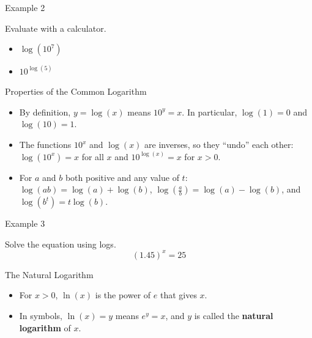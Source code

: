 \documentclass[ignorenonframetext,]{beamer}
\providecommand{\tightlist}{%
  \setlength{\itemsep}{0pt}\setlength{\parskip}{0pt}}
\begin{document}
\begin{frame}{Example 2}

Evaluate with a calculator.

\begin{itemize}
\tightlist
\item
  \(\log(10^7)\)
\item
  \(10^{\log(5)}\)
\end{itemize}

\end{frame}

\begin{frame}{Properties of the Common Logarithm}

\begin{itemize}
\tightlist
\item
  By definition, \(y = \log(x)\) means \(10^y = x\). In particular,
  \(\log(1) = 0\) and \(\log(10) = 1\).
\item
  The functions \(10^x\) and \(\log(x)\) are inverses, so they ``undo''
  each other: \(\log(10^x) = x\) for all \(x\) and \(10^{\log(x)} = x\)
  for \(x > 0\).
\item
  For \(a\) and \(b\) both positive and any value of \(t\):
  \(\log(ab) = \log(a) + \log(b)\),
  \(\log\left(\frac{a}{b}\right) = \log(a) - \log(b)\), and
  \(\log(b^t) = t\log(b)\).
\end{itemize}

\end{frame}

\begin{frame}{Example 3}

Solve the equation using logs. \[(1.45)^x = 25\]

\end{frame}

\begin{frame}{The Natural Logarithm}

\begin{itemize}
\tightlist
\item
  For \(x > 0\), \(\ln(x)\) is the power of \(e\) that gives \(x\).
\item
  In symbols, \(\ln(x) = y\) means \(e^y = x\), and \(y\) is called the
  \textbf{natural logarithm} of \(x\).
\end{itemize}

\end{frame}
\end{document}
